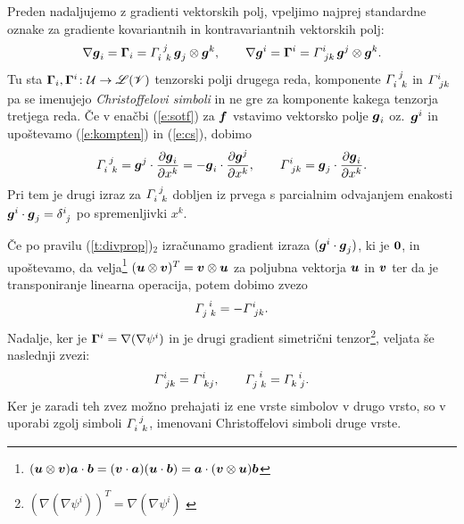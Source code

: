 Preden nadaljujemo z gradienti vektorskih polj, vpeljimo najprej standardne oznake
za gradiente kovariantnih in kontravariantnih vektorskih polj:
\begin{equation} \label{e:cs} %
	\nabla\vek{g}_i=\ten{\Gamma}_i=\cs{i}{j}{k}\,\vek{g}_j\otimes\vek{g}^k,\qquad
	\nabla\vek{g}^i=\ten{\Gamma}^i=\ks{i}{jk}\,\vek{g}^j\otimes\vek{g}^k.
\end{equation}
Tu sta $\mathbf \Gamma_i,\mathbf \Gamma^i\colon \mathcal U\to\mathscr L(\mathscr V)$ tenzorski polji drugega reda,
komponente $\cs{i}{j}{k}$ in $\ks{i}{jk}$ pa se imenujejo \emph{Christoffelovi simboli}
in ne gre za komponente kakega tenzorja tretjega reda. Če v enačbi (\ref{e:sotf})
za $\boldsymbol f$ vstavimo vektorsko polje $\boldsymbol g_i$ oz.~$\boldsymbol g^i$ in upoštevamo
(\ref{e:kompten}) in (\ref{e:cs}), dobimo
\begin{equation} \label{e:csexplicit}
	\cs{i}{j}{k}=\vek{g}^j\cdot\frac{\partial\vek{g}_i}{\partial x^k}
	=-\vek{g}_i\cdot\frac{\partial\vek{g}^j}{\partial x^k},\qquad
	\ks{i}{jk}=\vek{g}_j\cdot\frac{\partial\vek{g}_i}{\partial x^k}.
\end{equation}
Pri tem je drugi izraz za $\cs{i}{j}{k}$ dobljen iz prvega s parcialnim odvajanjem
enakosti $\vek{g}^i\cdot\vek{g}_j=\topbot{\delta}{i}{j}$ po spremenljivki $x^k$.

Če po pravilu (\ref{t:divprop})$_2$ izračunamo gradient izraza $(\boldsymbol g^i\cdot\boldsymbol g_j)$,
ki je $\boldsymbol 0$, in upoštevamo, da velja\footnote{
$(\boldsymbol u\otimes\boldsymbol v)\boldsymbol a\cdot\boldsymbol b=(\boldsymbol v\cdot\boldsymbol a)(\boldsymbol u\cdot\boldsymbol b)=
\boldsymbol a\cdot(\boldsymbol v\otimes\boldsymbol u)\boldsymbol b$}
$(\boldsymbol u\otimes\boldsymbol v)^{T}=\boldsymbol v\otimes\boldsymbol u$
za poljubna vektorja $\boldsymbol u$ in $\boldsymbol v$ ter da je transponiranje linearna operacija,
potem dobimo zvezo
\begin{equation} \label{e:lcs1}
	\cs{j}{i}{k}=-\ks{i}{jk}.
\end{equation}
Nadalje, ker je $\mathbf \Gamma^i=\nabla(\nabla\psi^i)$ in je drugi gradient
simetrični tenzor\footnote{$(\nabla(\nabla\psi^i))^T=\nabla(\nabla\psi^i)$ \cite[str.~271]{liu}},
veljata še naslednji zvezi:
\[ \ks{i}{jk}=\ks{i}{kj},\qquad\cs{j}{i}{k}=\cs{k}{i}{j}. \]
Ker je zaradi teh zvez možno prehajati iz ene vrste simbolov v drugo vrsto,
so v uporabi zgolj simboli $\cs{i}{j}{k}$, imenovani Christoffelovi simboli druge vrste.

